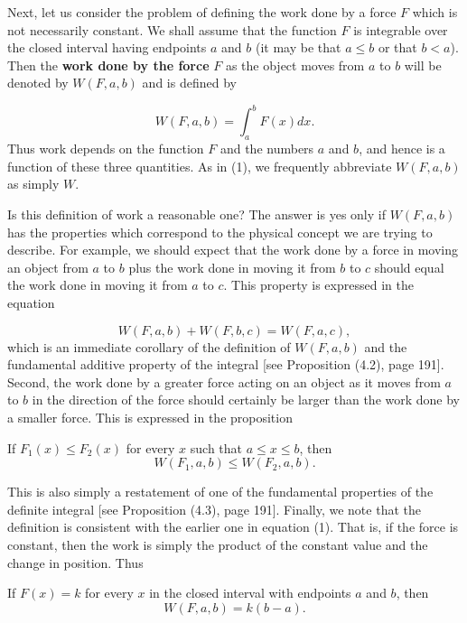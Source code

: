 Next, let us consider the problem of defining the work done by a force $F$ which is not necessarily constant. We shall assume that the function $F$ is integrable over the closed interval having endpoints $a$ and $b$ (it may be that $a \leq b$ or that $b < a$). Then the \textbf{work done by the force} $F$ as the object moves from $a$ to $b$ will be denoted by $W(F, a, b)$ and is defined by


\begin{equation}
W(F, a, b) = \int_a^b F(x)dx.  
\label{eq8.5.3}
\end{equation}
\noindent Thus work depends on the function $F$ and the numbers $a$ and $b$, and hence is a function of these three quantities. As in (1), we frequently abbreviate $W(F, a, b)$ as simply $W$.

Is this definition of work a reasonable one? The answer is yes only if $W(F, a, b)$ has the properties which correspond to the physical concept we are trying to describe. For example, we should expect that the work done by a force in moving an object from $a$ to $b$ plus the work done in moving it from $b$ to $c$ should equal the work done in moving it from $a$ to $c$. This property is expressed in the equation

\begin{theorem} %
$$ 
W(F, a, b) + W(F, b, c) = W(F, a, c),
$$
\noindent which is an immediate corollary of the definition of $W(F, a, b)$ and the fundamental additive property of the integral [see Proposition (4.2), page 191]. Second, the work done by a greater force acting on an object as it moves from $a$ to $b$ in the direction of the force should certainly be larger than the work done by a smaller force. This is expressed in the proposition
\end{theorem}

\begin{theorem} %
If $F_1(x) \leq F_2(x)$ for every $x$ such that $a \leq x \leq b$, then
$$
W(F_1, a, b) \leq W(F_2, a, b).
$$
\end{theorem} 
\noindent This is also simply a restatement of one of the fundamental properties of the definite integral [see Proposition (4.3), page 191]. Finally, we note that the definition is consistent with the earlier one in equation (1). That is, if the force is constant, then the work is simply the product of the constant value and the change in position. Thus

\begin{theorem} %
If $F(x) = k$ for every $x$ in the closed interval with endpoints $a$ and $b$, then $$
W(F, a, b) = k(b - a).
$$
\end{theorem} 

